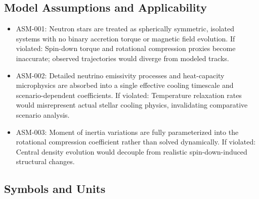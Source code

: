 \documentclass[11pt]{article}
\begin{document}
\subsection{Model Assumptions and Applicability}

\begin{itemize}\raggedright
\item ASM-001: Neutron stars are treated as spherically symmetric, isolated systems with no binary accretion torque or magnetic field evolution. If violated: Spin-down torque and rotational compression proxies become inaccurate; observed trajectories would diverge from modeled tracks.
\item ASM-002: Detailed neutrino emissivity processes and heat-capacity microphysics are absorbed into a single effective cooling timescale and scenario-dependent coefficients. If violated: Temperature relaxation rates would misrepresent actual stellar cooling physics, invalidating comparative scenario analysis.
\item ASM-003: Moment of inertia variations are fully parameterized into the rotational compression coefficient rather than solved dynamically. If violated: Central density evolution would decouple from realistic spin-down-induced structural changes.
\end{itemize}

\subsection{Symbols and Units}
\end{document}
